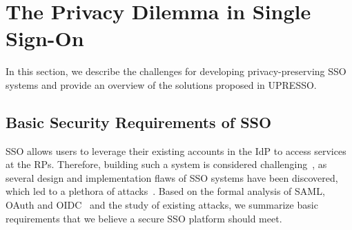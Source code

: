 ﻿\section{The Privacy Dilemma in Single Sign-On}
\label{sec:challenge}



In this section, we describe the challenges for developing privacy-preserving SSO systems and provide an overview of the solutions proposed in UPRESSO.


\subsection{Basic Security Requirements of SSO}
\label{subsec:basicrequirements}

SSO allows users to leverage their existing accounts in the IdP to access services at the RPs.
Therefore, building such a system is considered challenging~\cite{SPRESSO}, as several design and implementation flaws of SSO systems have been discovered, which led to a plethora of attacks~\cite{SomorovskyMSKJ12,WangCW12,ArmandoCCCPS13,ZhouE14,WangZLLYLG15,WangZLG16,YangLLZH16,MainkaMS16,MohsenS16,MainkaMSW17,YangLCZ18,YangLS17,ShiWL19}.
Based on the formal analysis of SAML, OAuth and OIDC~\cite{ArmandoCCCT08,FettKS16, FettKS17} and the study of existing attacks, we summarize basic requirements that we believe a secure SSO platform should meet.

